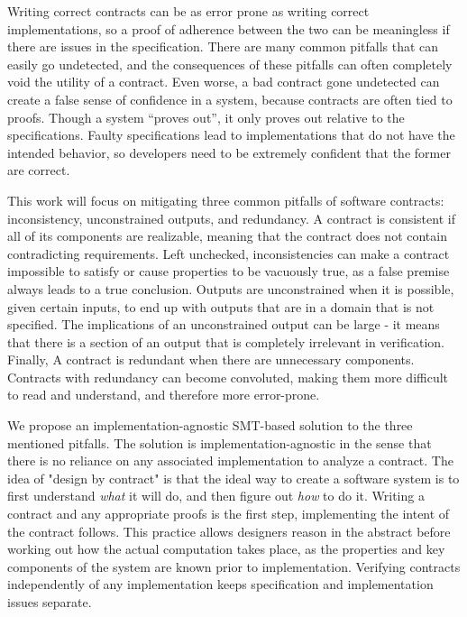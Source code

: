 \documentclass{article}
\begin{document}
Writing correct contracts can be as error prone as writing correct implementations, so a proof of adherence
between the two can be meaningless if there are issues in the specification. There are many common pitfalls
that can easily go undetected, and the consequences of these pitfalls can often completely void the utility of
a contract. Even worse, a bad contract gone undetected can create a false sense of confidence in a system,
because contracts are often tied to proofs. Though a system “proves out”, it only proves out relative to the
specifications. Faulty specifications lead to implementations that do not have the intended behavior, so developers 
need to be extremely confident that the former are correct. 

This work will focus on mitigating three common pitfalls of software contracts: inconsistency, unconstrained
outputs, and redundancy. A contract is consistent if all of its components are realizable, meaning that the contract
does not contain contradicting requirements. Left unchecked, inconsistencies can make a contract impossible to satisfy
or cause properties to be vacuously true, as a false premise always leads to a true conclusion. Outputs are
unconstrained when it is possible, given certain inputs, to end up with outputs that are in a domain that is not specified.
The implications of an unconstrained output can be large - it means that there is a section of an output that is
completely irrelevant in verification. Finally, A contract is redundant when there are unnecessary components. Contracts
with redundancy can become convoluted, making them more difficult to read and understand, and therefore more
error-prone.

We propose an implementation-agnostic SMT-based solution to the three mentioned pitfalls. The solution is implementation-agnostic in the sense
that there is no reliance on any associated implementation to analyze a contract. The idea of "design by contract" \cite{meyer1992applying} is that the 
ideal way to create a software system is to first understand {\it what} it will do, and then figure out {\it how} to do it. Writing a contract and 
any appropriate proofs is the first step, implementing the intent of the contract follows. This practice allows designers reason in the abstract 
before working out how the actual computation takes place, as the properties and key components of the system are known prior to implementation. 
Verifying contracts independently of any implementation keeps specification and implementation issues separate. 
\end{document}

